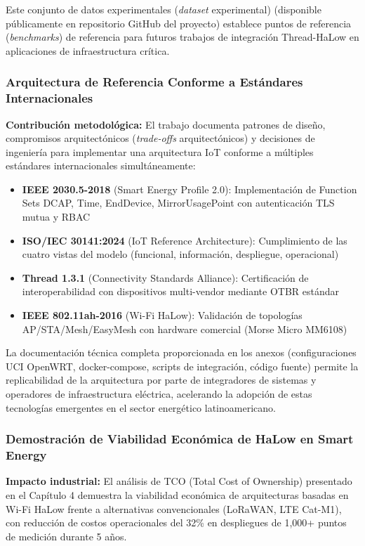 Este conjunto de datos experimentales (\textit{dataset} experimental) (disponible públicamente en repositorio GitHub del proyecto) establece puntos de referencia (\textit{benchmarks}) de referencia para futuros trabajos de integración Thread-HaLow en aplicaciones de infraestructura crítica.

\subsubsection{Arquitectura de Referencia Conforme a Estándares Internacionales}

\textbf{Contribución metodológica:} El trabajo documenta patrones de diseño, compromisos arquitectónicos (\textit{trade-offs} arquitectónicos) y decisiones de ingeniería para implementar una arquitectura IoT conforme a múltiples estándares internacionales simultáneamente:

\begin{itemize}
\item \textbf{IEEE 2030.5-2018} (Smart Energy Profile 2.0): Implementación de Function Sets DCAP, Time, EndDevice, MirrorUsagePoint con autenticación TLS mutua y RBAC
\item \textbf{ISO/IEC 30141:2024} (IoT Reference Architecture): Cumplimiento de las cuatro vistas del modelo (funcional, información, despliegue, operacional)
\item \textbf{Thread 1.3.1} (Connectivity Standards Alliance): Certificación de interoperabilidad con dispositivos multi-vendor mediante OTBR estándar
\item \textbf{IEEE 802.11ah-2016} (Wi-Fi HaLow): Validación de topologías AP/STA/Mesh/EasyMesh con hardware comercial (Morse Micro MM6108)
\end{itemize}

La documentación técnica completa proporcionada en los anexos (configuraciones UCI OpenWRT, docker-compose, scripts de integración, código fuente) permite la replicabilidad de la arquitectura por parte de integradores de sistemas y operadores de infraestructura eléctrica, acelerando la adopción de estas tecnologías emergentes en el sector energético latinoamericano.

\subsubsection{Demostración de Viabilidad Económica de HaLow en Smart Energy}

\textbf{Impacto industrial:} El análisis de TCO (Total Cost of Ownership) presentado en el Capítulo 4 demuestra la viabilidad económica de arquitecturas basadas en Wi-Fi HaLow frente a alternativas convencionales (LoRaWAN, LTE Cat-M1), con reducción de costos operacionales del 32\% en despliegues de 1,000+ puntos de medición durante 5 años.

